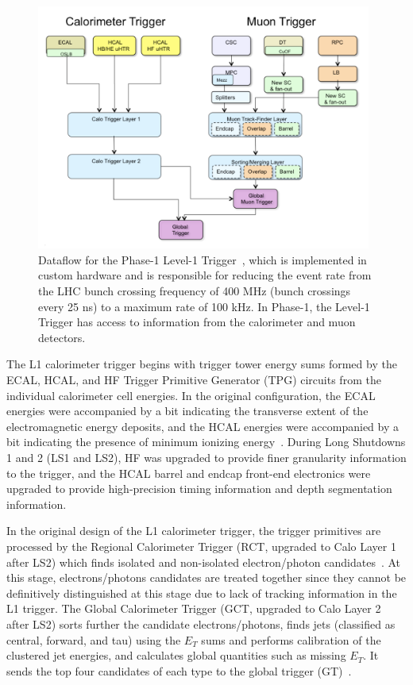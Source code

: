\begin{figure}[ht]
    \centering
    \includegraphics[width=11cm]{figures/ch-2-cern-cms/phase-1-level-1-trigger-dataflow.png}
    \caption[Dataflow for the Phase-1 Level-1 Trigger.]{Dataflow for the Phase-1 Level-1 Trigger~\cite{CMS-TDR-012}, which is implemented in custom hardware and is responsible for reducing the event rate from the LHC bunch crossing frequency of 400 MHz (bunch crossings every 25 ns) to a maximum rate of 100 kHz. In Phase-1, the Level-1 Trigger has access to information from the calorimeter and muon detectors.}
    \label{fig:phase-1-level-1-trigger-dataflow}
\end{figure}

The L1 calorimeter trigger begins with trigger tower energy sums formed by the ECAL, HCAL, and HF Trigger Primitive Generator (TPG) circuits from the individual calorimeter cell energies. In the original configuration, the ECAL energies were accompanied by a bit indicating the transverse extent of the electromagnetic energy deposits, and the HCAL energies were accompanied by a bit indicating the presence of minimum ionizing energy~\cite{CERN-LHCC-2000-038}. During Long Shutdowns 1 and 2 (LS1 and LS2), HF was upgraded to provide finer granularity information to the trigger, and the HCAL barrel and endcap front-end electronics were upgraded to provide high-precision timing information and depth segmentation information. 

In the original design of the L1 calorimeter trigger, the trigger primitives are processed by the Regional Calorimeter Trigger (RCT, upgraded to Calo Layer 1 after LS2) which finds isolated and non-isolated electron/photon candidates~\cite{CMS-TDR-012}. At this stage, electrons/photons candidates are treated together since they cannot be definitively distinguished at this stage due to lack of tracking information in the L1 trigger. The Global Calorimeter Trigger (GCT, upgraded to Calo Layer 2 after LS2) sorts further the candidate electrons/photons, finds jets (classified as central, forward, and tau) using the $E_T$ sums and performs calibration of the clustered jet energies, and calculates global quantities such as missing $E_T$. It sends the top four candidates of each type to the global trigger (GT)~\cite{CMS-TDR-012}.

